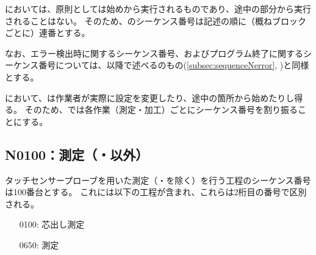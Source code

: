 \DMC においては、原則として\CreatedNCSubPrg は始めから実行されるものであり、途中の部分から実行されることはない。
そのため、\nameCreatedNCSubPrg のシーケンス番号は記述の順に（概ねブロックごとに）連番とする。

なお、エラー検出時に関するシーケンス番号、およびプログラム終了に関するシーケンス番号については、以降で述べる\CreatedNCMainPrg のもの(\autoref{subsec:sequenceNerror}, )と同様とする。



\clearpage
\DMC において、\CreatedNCMainPrg は作業者が実際に設定を変更したり、途中の箇所から始めたりし得る。
そのため、\CreatedNCMainPrg では各作業（測定・加工）ごとにシーケンス番号を割り振ることにする。


\subsection{N0100：測定（\Dimple・\ReliefGroove 以外）}
タッチセンサープローブを用いた測定（\Dimple ・\ReliefGroove を除く）を行う工程のシーケンス番号は100番台とする。
これには以下の工程が含まれ、これらは2桁目の番号で区別される。
\begin{enumerate}
\item[0100:] 芯出し測定
\item[0650:] \nameCenterlineEndFaceDif 測定
\end{enumerate}


